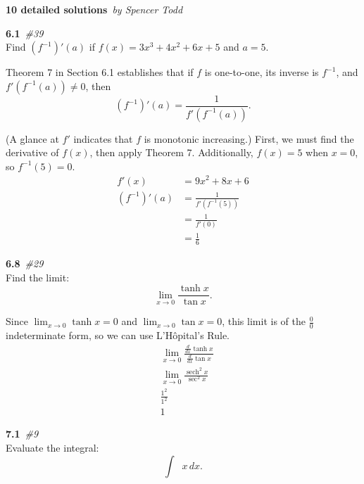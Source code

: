 \documentclass[12pt]{article}
\DeclareMathOperator{\sech}{sech}
\DeclareMathOperator{\invcos}{cos^{-1}}
\newcommand{\bfit}[2]{\textbf{#1}\ \textit{#2}}
\renewcommand{\title}[2]{\large\bfit{#1}{#2}\normalsize}
\newcommand{\double}[0]{\par\null\par}
\renewcommand{\section}[2]{\double\LARGE\bfit{#1}{\##2}\normalsize\\}
\newcommand{\paren}[1]{\left({#1}\right)}
\let\xint\int
\renewcommand{\int}[2]{\xint{#1}\,d#2}
\begin{document}
\selectfont
\title{10 detailed solutions}{by Spencer Todd}
\section{6.1}{39}
Find $\paren{f^{-1}}'\paren{a}$ if $f\paren{x}=3x^3+4x^2+6x+5$ and $a=5$.\double

Theorem 7 in Section 6.1 establishes that if $f$ is one-to-one, its inverse is
$f^{-1}$, and \\$f'\paren{f^{-1}\paren{a}}\neq 0$, then
%
\begin{equation*}
\paren{f^{-1}}'\paren{a}=\frac{1}{f'\paren{f^{-1}\paren{a}}}.
\end{equation*}

(A glance at $f'$ indicates that $f$ is monotonic increasing.) First, we must find the derivative of $f\paren{x}$, then apply
Theorem 7. Additionally, $f\paren{x}=5$ when $x=0$, so
$f^{-1}\paren{5}=0$.
%
\begin{align*}
f'\paren{x}&=9x^2+8x+6 \\
%
\paren{f^{-1}}'\paren{a}&=\frac{1}{f'\paren{f^{-1}\paren{5}}} \\
&=\frac{1}{f'\paren{0}} \\
&=\frac{1}{6}
\end{align*}

\section{6.8}{29}
Find the limit:
%
\begin{equation*}
\lim_{x\to 0}\frac{\tanh{x}}{\tan{x}}.
\end{equation*}\double

Since $\displaystyle\lim_{x\to 0}\tanh{x}=0$ and $\displaystyle\lim_{x\to 0}\tan{x}=0$, this limit is of the
$\frac{0}{0}$ indeterminate form, so we can use L'H\^{o}pital's Rule.
%
\begin{align*}
&\lim_{x\to 0}\frac{\frac{d}{dx}\tanh{x}}{\frac{d}{dx}\tan{x}} \\
&\lim_{x\to 0}\frac{\sech^2 x}{\sec^2 x} \\
&\frac{1^2}{1^2} \\
&1
\end{align*}

\section{7.1}{9}
Evaluate the integral:
%
\begin{equation*}
\int{\invcos{x}}{x}.
\end{equation*}\double
\end{document}
